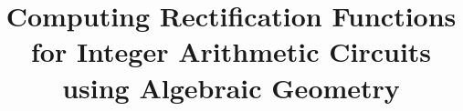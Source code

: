 \documentclass[10pt,twocolumn]{IEEEtran}
\theoremstyle{definition}
\begin{document}

\title{\Large{\sc Computing Rectification Functions for Integer
    Arithmetic Circuits using Algebraic Geometry} } 


\maketitle









\end{document}
